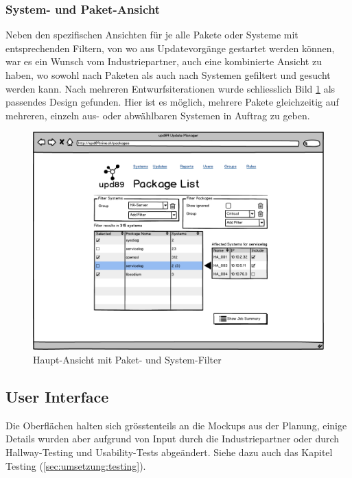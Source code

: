 \subsubsection*{System- und Paket-Ansicht}

Neben den spezifischen Ansichten für je alle Pakete oder Systeme mit entsprechenden Filtern, von wo aus Updatevorgänge gestartet werden können, war es ein Wunsch vom Industriepartner, auch eine kombinierte Ansicht zu haben, wo sowohl nach Paketen als auch nach Systemen gefiltert und gesucht werden kann. Nach mehreren Entwurfsiterationen wurde schliesslich Bild \ref{fig:design:combo_view_mockup} als passendes Design gefunden. Hier ist es möglich, mehrere Pakete gleichzeitig auf mehreren, einzeln aus- oder abwählbaren Systemen in Auftrag zu geben.

\begin{figure}[H]
	\centering
	\includegraphics[width=\linewidth]{files/mockups/combo_view}
	\caption{Haupt-Ansicht mit Paket- und System-Filter}
	\label{fig:design:combo_view_mockup}
\end{figure}

\subsection*{User Interface}

Die Oberflächen halten sich grösstenteils an die Mockups aus der Planung, einige Details wurden aber aufgrund von Input durch die Industriepartner oder durch Hallway-Testing und Usability-Tests abgeändert. Siehe dazu auch das Kapitel Testing (\ref{sec:umsetzung:testing}).

